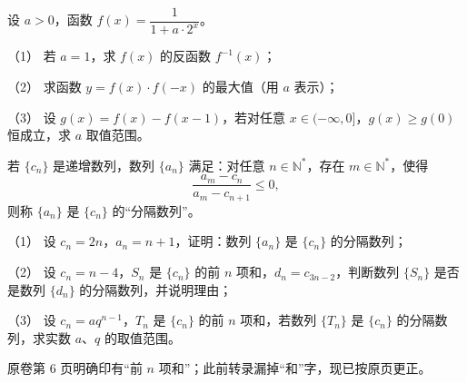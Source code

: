\begin{question}
设 $a>0$，函数 $f(x)=\dfrac{1}{1+a\cdot2^x}$。

（1） 若 $a=1$，求 $f(x)$ 的反函数 $f^{-1}(x)$；

（2） 求函数 $y=f(x)\cdot f(-x)$ 的最大值（用 $a$ 表示）；

（3） 设 $g(x)=f(x)-f(x-1)$，若对任意 $x\in(-\infty,0]$，$g(x)\geq g(0)$ 恒成立，求 $a$ 取值范围。

\end{question}
\begin{question}
若 $\{c_n\}$ 是递增数列，数列 $\{a_n\}$ 满足：对任意 $n\in\mathbb N^*$，存在 $m\in\mathbb N^*$，使得
\nopagebreak[4]
\[
\frac{a_m-c_n}{a_m-c_{n+1}}\leq0,
\]
则称 $\{a_n\}$ 是 $\{c_n\}$ 的“分隔数列”。

（1） 设 $c_n=2n$，$a_n=n+1$，证明：数列 $\{a_n\}$ 是 $\{c_n\}$ 的分隔数列；

（2） 设 $c_n=n-4$，$S_n$ 是 $\{c_n\}$ 的前 $n$ 项和，$d_n=c_{3n-2}$，判断数列 $\{S_n\}$ 是否是数列 $\{d_n\}$ 的分隔数列，并说明理由；

（3） 设 $c_n=aq^{n-1}$，$T_n$ 是 $\{c_n\}$ 的前 $n$ 项和，若数列 $\{T_n\}$ 是 $\{c_n\}$ 的分隔数列，求实数 $a\text{、}q$ 的取值范围。

\begin{gktip}
原卷第 6 页明确印有“前 $n$ 项和”；此前转录漏掉“和”字，现已按原页更正。
\end{gktip}

\end{question}